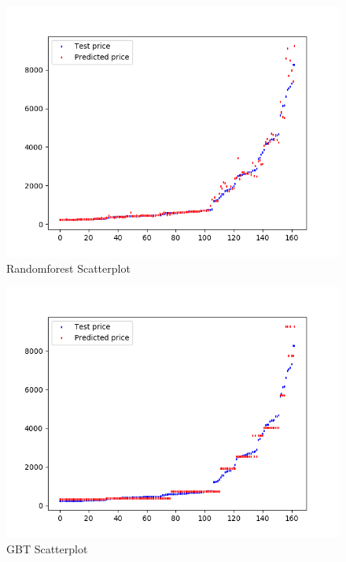 \documentclass[sigconf]{acmart}
\begin{document}
\begin{figure}[!ht]
  \centering\includegraphics[width=\columnwidth]{images/RandomForestscatterplot.png}
  \caption{Randomforest Scatterplot}
  \label{scpl:ran}
\end{figure}

\begin{figure}[!ht]
  \centering\includegraphics[width=\columnwidth]{images/GBTscatterplot.png}
  \caption{GBT Scatterplot}
  \label{scpl:gbt}
\end{figure}
\end{document}
